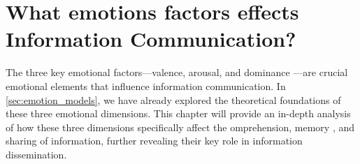 \section{What emotions factors effects Information Communication?} \label{sec:what} %


The three key emotional factors—valence, arousal, and dominance \cite{mehrabian1974approach, osgood1952nature}—are crucial emotional elements that influence information communication. In \cref{sec:emotion_models}, we have already explored the theoretical foundations of these three emotional dimensions. This chapter will provide an in-depth analysis of how these three dimensions specifically affect the omprehension\cite{egidi2012emotional, megalakaki2019effects, mather2011arousal, tyng2017influences}, memory \cite{pawlowska2011influence, madan2019positive,megalakaki2019effects}, and sharing \cite{ferrara2015measuring, stieglitz2013emotions, vosoughi2018spread} of information, further revealing their key role in information dissemination.




